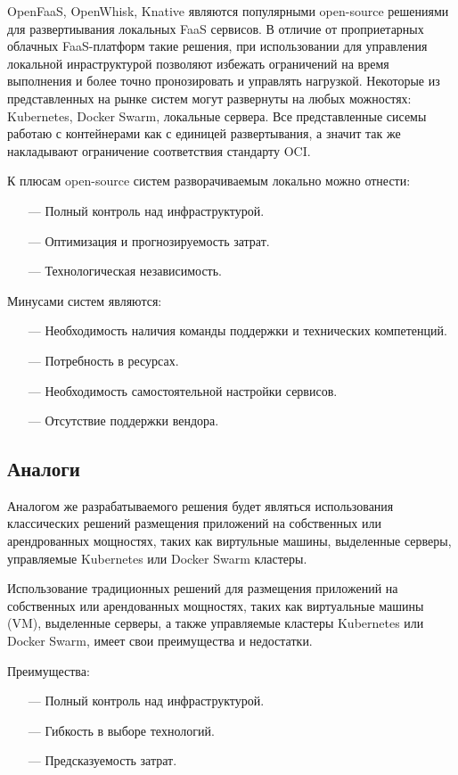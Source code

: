 OpenFaaS, OpenWhisk, Knative являются популярными open-source\cite{bretthauer2001open} решениями для развертиывания локальных FaaS сервисов. В отличие от проприетарных облачных FaaS-платформ такие решения, при использовании для управления локальной инраструктурой позволяют избежать ограничений на время выполнения и более точно пронозировать и управлять нагрузкой. Некоторые из представленных на рынке систем могут развернуты на любых можностях: Kubernetes, Docker Swarm, локальные сервера. Все представленные сисемы работаю с контейнерами как с единицей развертывания, а значит так же накладывают ограничение соответствия стандарту OCI.

К плюсам open-source систем разворачиваемым локально можно отнести:
\begin{itemize}
    \item[---] Полный контроль над инфраструктурой.
    \item[---] Оптимизация и прогнозируемость затрат.
    \item[---] Технологическая независимость.
\end{itemize}
    
Минусами систем являются:
\begin{itemize}
    \item[---] Необходимость наличия команды поддержки и технических компетенций.
    \item[---] Потребность в ресурсах.
    \item[---] Необходимость самостоятельной настройки сервисов.
    \item[---] Отсутствие поддержки вендора.
\end{itemize}

\subsection{Аналоги}

Аналогом же разрабатываемого решения будет являться использования классических решений размещения приложений на собственных или арендрованных мощностях, таких как виртульные машины, выделенные серверы, управляемые Kubernetes или Docker Swarm кластеры.

Использование традиционных решений для размещения приложений на собственных или арендованных мощностях, таких как виртуальные машины (VM), выделенные серверы, а также управляемые кластеры Kubernetes или Docker Swarm, имеет свои преимущества и недостатки.

Преимущества:
\begin{itemize}
    \item[---]Полный контроль над инфраструктурой.
    \item[---]Гибкость в выборе технологий.
    \item[---]Предсказуемость затрат.
\end{itemize}

